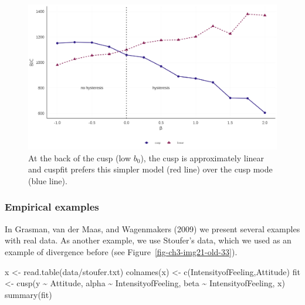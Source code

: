 \documentclass[
  a4paper,
  DIV=11,
  numbers=noendperiod]{scrreprt}
\newenvironment{Shaded}{\begin{snugshade}}{\end{snugshade}}
\newcommand{\FunctionTok}[1]{\textcolor[rgb]{0.28,0.35,0.67}{#1}}
\newcommand{\NormalTok}[1]{\textcolor[rgb]{0.00,0.23,0.31}{#1}}
\newcommand{\OtherTok}[1]{\textcolor[rgb]{0.00,0.23,0.31}{#1}}
\newcommand{\SpecialCharTok}[1]{\textcolor[rgb]{0.37,0.37,0.37}{#1}}
\newcommand{\StringTok}[1]{\textcolor[rgb]{0.13,0.47,0.30}{#1}}
\begin{document}
\begin{figure}

{\centering \includegraphics{media/ch3/fig-ch3-img23-old-35.jpg}

}

\caption{\label{fig-ch3-img23-old-35}At the back of the cusp (low
\(b_0\)), the cusp is approximately linear and cuspfit prefers this
simpler model (red line) over the cusp mode (blue line).}

\end{figure}

\hypertarget{sec-Empirical-examples}{%
\subsubsection{Empirical examples}\label{sec-Empirical-examples}}

In Grasman, van der Maas, and Wagenmakers (2009) we present several
examples with real data. As another example, we use Stoufer's data,
which we used as an example of divergence before (see
Figure~\ref{fig-ch3-img21-old-33}).

\begin{Shaded}
\begin{Highlighting}[]
\NormalTok{x }\OtherTok{\textless{}{-}} \FunctionTok{read.table}\NormalTok{(}\StringTok{\textquotesingle{}data/stoufer.txt\textquotesingle{}}\NormalTok{)}
\FunctionTok{colnames}\NormalTok{(x) }\OtherTok{\textless{}{-}} \FunctionTok{c}\NormalTok{(}\StringTok{\textquotesingle{}IntensityofFeeling\textquotesingle{}}\NormalTok{,}\StringTok{\textquotesingle{}Attitude\textquotesingle{}}\NormalTok{)}
\NormalTok{fit }\OtherTok{\textless{}{-}} \FunctionTok{cusp}\NormalTok{(y }\SpecialCharTok{\textasciitilde{}}\NormalTok{ Attitude, alpha }\SpecialCharTok{\textasciitilde{}}\NormalTok{ IntensityofFeeling, beta }\SpecialCharTok{\textasciitilde{}}\NormalTok{ IntensityofFeeling, x)}
\FunctionTok{summary}\NormalTok{(fit)}
\end{Highlighting}
\end{Shaded}
\end{document}
